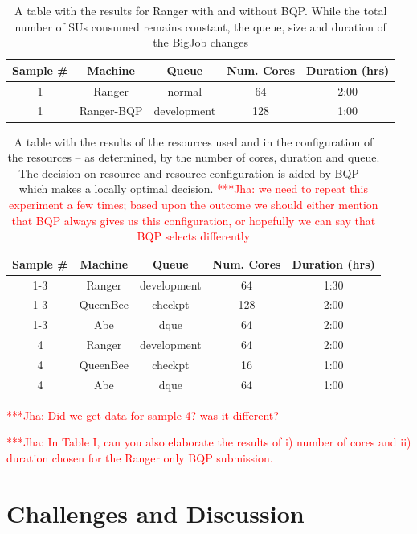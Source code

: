\documentclass[conference,final]{IEEEtran}
\newcommand{\jhanote}[1]{ {\textcolor{red} { ***Jha: #1 }}}
\newcommand{\jhanote}[1]{}
\begin{document}
\begin{table}
\begin{tabular}{|c|c|c|c|c|}
\hline Sample \# & Machine & Queue & Num. Cores & Duration (hrs) \\ 
\hline 1 & Ranger & normal & 64 & 2:00 \\ 
\hline 1 & Ranger-BQP & development & 128 & 1:00 \\ 
\hline 
\end{tabular} 
\caption{A table with the results for Ranger with and without BQP. While the
    total number of SUs consumed remains constant, the queue, size and duration
    of the BigJob changes}
\end{table}


\begin{table}
\begin{tabular}{|c|c|c|c|c|}
\hline Sample \# & Machine & Queue & Num. Cores & Duration (hrs) \\ 
\hline 1-3 & Ranger & development & 64 & 1:30 \\ 
\hline 1-3 & QueenBee & checkpt & 128 & 2:00 \\ 
\hline 1-3 & Abe & dque & 64 & 2:00 \\ 
\hline 4 & Ranger & development & 64 & 2:00 \\ 
\hline 4 & QueenBee & checkpt & 16 & 1:00 \\ 
\hline 4 & Abe & dque & 64 & 1:00 \\ 
\hline 
\end{tabular} 
\caption{A table with the results of the resources used and in
  the configuration of the resources -- as determined, by the
  number of cores, duration and queue. The decision on
  resource and resource configuration is aided by BQP -- which 
  makes a locally optimal decision. \jhanote{we need to repeat
    this experiment a few times; based upon the outcome we should either
    mention that BQP always gives us this configuration, or hopefully we
    can say that BQP selects differently}}
\end{table}

\jhanote{Did we get data for sample 4? was it different?}

\jhanote{In Table I, can you also elaborate the results of i) number
  of cores and ii) duration chosen for the Ranger only BQP
  submission.}



\section{Challenges and Discussion}
\end{document}
